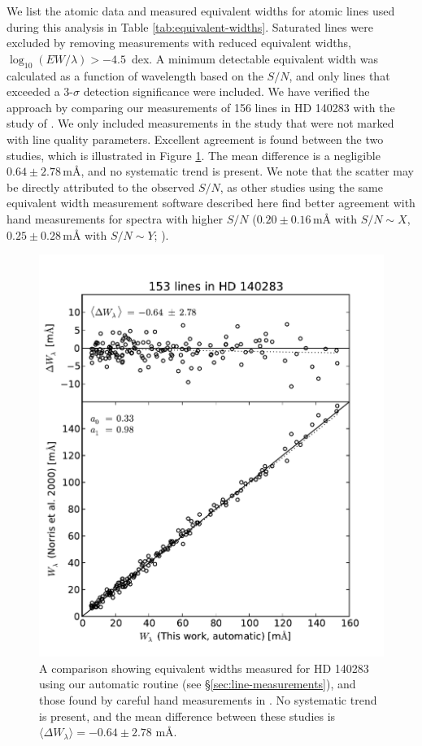 \documentclass{emulateapj}
\begin{document}
We list the atomic data and measured equivalent widths for atomic lines used during this analysis in Table \ref{tab:equivalent-widths}. Saturated lines were excluded by removing measurements with reduced equivalent widths, $\log_{10}{(EW/\lambda)} > -4.5$\, dex. A minimum detectable equivalent width was calculated as a function of wavelength based on the $S/N$, and only lines that exceeded a 3-$\sigma$ detection significance were included. We have verified the approach by comparing our measurements of 156 lines in HD 140283 with the study of \citet{norris;et-al_1996}. We only included measurements in the \citet{norris;et-al_1996} study that were not marked with line quality parameters. Excellent agreement is found between the two studies, which is illustrated in Figure \ref{fig:ew-compare}. The mean difference is a negligible $0.64 \pm 2.78$\,m\AA{}, and no systematic trend is present. We note that the scatter may  be directly attributed to the observed $S/N$, as other studies using the same equivalent width measurement software described here find better agreement with hand measurements for spectra with higher $S/N$ ($0.20 \pm 0.16$\,m{\AA} with $S/N \sim X$, $0.25 \pm 0.28$\,m{\AA} with $S/N \sim{} Y$; \citet{frebel;et-al_2013}).

\begin{figure}[h]
	\includegraphics[width=\columnwidth]{./figures/smh-norris.pdf}
	\caption{A comparison showing equivalent widths measured for HD 140283 using our automatic routine (see \S\ref{sec:line-measurements}), and those found by careful hand measurements in \citet{norris;et-al_1996}. No systematic trend is present, and the mean difference between these studies is $\langle\Delta{}W_\lambda\rangle = -0.64 \pm 2.78$ m\AA{}.}
	\label{fig:ew-compare}
\end{figure}
\end{document}
